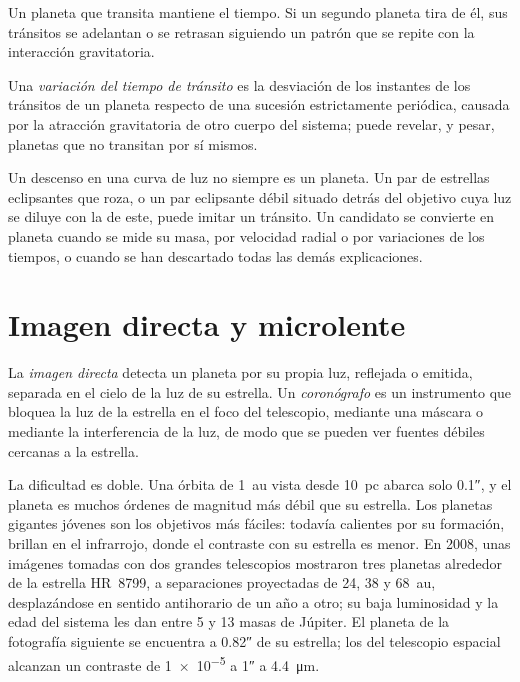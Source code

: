 Un planeta que transita mantiene el tiempo. Si un segundo planeta tira de él,
sus tránsitos se adelantan o se retrasan siguiendo un patrón que se repite con la
interacción gravitatoria.

\begin{definition}\label{def:b3:exoplanets:ttv}
Una \emph{variación del tiempo de tránsito} es la
desviación de los instantes de los tránsitos de un planeta respecto de una
sucesión estrictamente periódica, causada por la atracción gravitatoria de otro cuerpo del
sistema; puede revelar, y pesar, planetas que no transitan
por sí mismos.
\end{definition}

Un descenso en una curva de luz no siempre es un planeta. Un par de
estrellas eclipsantes que roza, o un par eclipsante débil situado detrás del objetivo
cuya luz se diluye con la de este, puede imitar un tránsito. Un candidato se convierte
en planeta cuando se mide su masa, por velocidad radial o por variaciones de los tiempos,
o cuando se han descartado todas las demás explicaciones.

\section{Imagen directa y microlente}\label{sec:b3:exoplanets:imaging}

\begin{definition}\label{def:b3:exoplanets:imaging}
La \emph{imagen directa} detecta un planeta por su propia
luz, reflejada o emitida, separada en el cielo de la luz de su estrella. Un
\emph{coronógrafo} es un instrumento que bloquea
la luz de la estrella en el foco del telescopio, mediante una máscara o
mediante la interferencia de la luz, de modo que se pueden ver fuentes débiles
cercanas a la estrella.
\end{definition}

La dificultad es doble. Una órbita de \qty{1}{au} vista desde \qty{10}{pc}
abarca solo \ang{;;0.1}, y el planeta es muchos órdenes de magnitud más débil
que su estrella. Los planetas gigantes jóvenes son los objetivos más fáciles: todavía calientes
por su formación, brillan en el infrarrojo, donde el contraste con su estrella es menor.
En 2008, unas imágenes tomadas con dos grandes telescopios mostraron tres
planetas alrededor de la estrella HR~8799, a separaciones proyectadas de 24, 38 y
\qty{68}{au}, desplazándose en sentido antihorario de un año a otro; su baja
luminosidad y la edad del sistema les dan entre 5 y 13
masas de Júpiter. El planeta de la fotografía siguiente se encuentra a \ang{;;0.82} de
su estrella; los  del telescopio espacial alcanzan un contraste de
\num{1e-5} a \ang{;;1} a \qty{4.4}{\micro m}.

